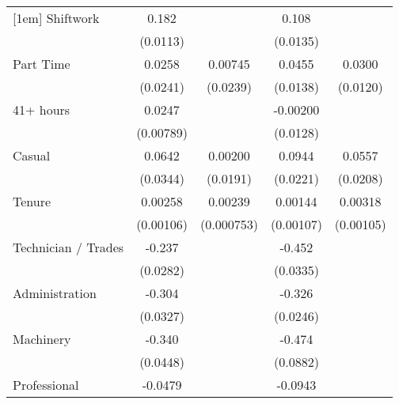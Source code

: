 {\begin{tabular}{l*{4}{c}}
[1em]
Shiftwork           &       0.182\sym{***}&                     &       0.108\sym{***}&                     \\
                    &    (0.0113)         &                     &    (0.0135)         &                     \\
[1em]
Part Time           &      0.0258         &     0.00745         &      0.0455\sym{**} &      0.0300\sym{*}  \\
                    &    (0.0241)         &    (0.0239)         &    (0.0138)         &    (0.0120)         \\
[1em]
41+ hours           &      0.0247\sym{**} &                     &    -0.00200         &                     \\
                    &   (0.00789)         &                     &    (0.0128)         &                     \\
[1em]
Casual              &      0.0642         &     0.00200         &      0.0944\sym{***}&      0.0557\sym{**} \\
                    &    (0.0344)         &    (0.0191)         &    (0.0221)         &    (0.0208)         \\
[1em]
Tenure              &     0.00258\sym{*}  &     0.00239\sym{**} &     0.00144         &     0.00318\sym{**} \\
                    &   (0.00106)         &  (0.000753)         &   (0.00107)         &   (0.00105)         \\
[1em]
Technician / Trades &      -0.237\sym{***}&                     &      -0.452\sym{***}&                     \\
                    &    (0.0282)         &                     &    (0.0335)         &                     \\
[1em]
Administration      &      -0.304\sym{***}&                     &      -0.326\sym{***}&                     \\
                    &    (0.0327)         &                     &    (0.0246)         &                     \\
[1em]
Machinery           &      -0.340\sym{***}&                     &      -0.474\sym{***}&                     \\
                    &    (0.0448)         &                     &    (0.0882)         &                     \\
[1em]
Professional        &     -0.0479\sym{*}  &                     &     -0.0943\sym{***}&                     \\

\end{tabular}}

